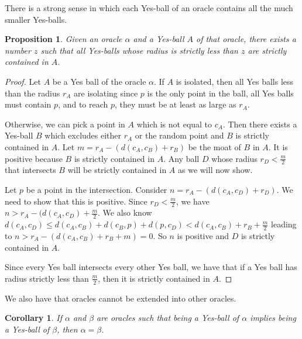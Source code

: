\documentclass[12pt]{article}
\newtheorem{corollary}{Corollary}[section]
\newtheorem{proposition}{Proposition}[section]
\begin{document}
There is a strong sense in which each Yes-ball of an oracle contains all the much smaller Yes-balls. 

\begin{proposition}{\label{prop:zcontain}}
    Given an oracle $\alpha$ and a Yes-ball $A$ of that oracle, there exists a number $z$ such that all Yes-balls whose radius is strictly less than $z$ are strictly contained in $A$. 
\end{proposition}

\begin{proof}
Let $A$ be a Yes ball of the oracle $\alpha$. If $A$ is isolated, then all Yes balls less than the radius $r_A$ are isolating since $p$ is the only point in the ball, all Yes balls must contain $p$, and to reach $p$, they must be at least as large as $r_A$. 

Otherwise, we can pick a point in $A$ which is not equal to $c_A$. Then there exists a Yes-ball $B$ which excludes either $r_A$ or the random point and $B$ is strictly contained in $A$. Let $m = r_A - (d(c_A,c_B) + r_B)$ be the moat of $B$ in $A$. It is positive because $B$ is strictly contained in $A$.  Any ball $D$ whose radius $r_D < \frac{m}{2}$ that intersects $B$ will be strictly contained in $A$ as we will now show.

Let $p$ be a point in the intersection. Consider $n = r_A - (d(c_A, c_D) + r_D)$. We need to show that this is positive. Since $r_D < \frac{m}{2}$, we have $n > r_A - (d(c_A, c_D) + \frac{m}{2}$. We also know $d(c_A, c_D) \leq d(c_A, c_B) + d(c_B, p) + d(p, c_D) < d(c_A, c_B) + r_B + \frac{m}{2}$ leading to $n > r_A - (d(c_A, c_B) + r_B  + m) = 0 $. So $n$ is positive and $D$ is strictly contained in $A$. 

Since every Yes ball intersects every other Yes ball, we have that if a Yes ball has radius strictly less than $\frac{m}{2}$, then it is strictly contained in $A$. 
\end{proof}

We also have that oracles cannot be extended into other oracles. 

\begin{corollary}\label{cor:noextension}
    If $\alpha$ and $\beta$ are oracles such that being a Yes-ball of $\alpha$ implies being a Yes-ball of $\beta$, then $\alpha=\beta$.
\end{corollary}
\end{document}
